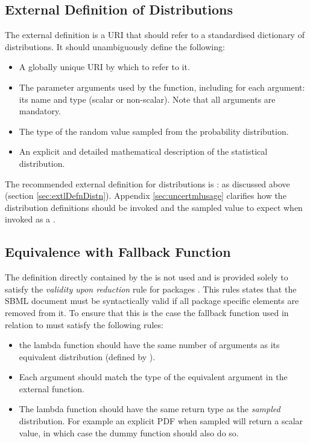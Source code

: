 \documentclass[draftspec]{sbmlpkgspec}
\begin{document}
\subsection{External Definition of Distributions}
\label{sec:externaldistdef}

The external definition is a URI that should refer to a standardised
dictionary of distributions. It should unambiguously define the
following:

\begin{itemize}
\item A globally unique URI by which to refer to it.
\item The parameter arguments used by the function, including for each
 argument: its name and type (scalar or non-scalar). Note that all
 arguments are mandatory.
\item The type of the random value sampled from the probability distribution.
\item An explicit and detailed mathematical description of the statistical distribution.
\end{itemize}

The recommended external definition for distributions is \uncertml: as
discussed above (section \ref{sec:extlDefnDistn}). Appendix
\ref{sec:uncertmlusage} clarifies how the distribution definitions
should be invoked and the sampled value to expect when invoked as a
.

\subsection{Equivalence with Fallback Function}
\label{sec:fallbackfunc}

The \mathml definition directly contained by the
 is not used and is provided solely to
satisfy the \emph{validity upon reduction} rule for packages
\cite{sbmll3v1packrule}. This rules states that the SBML document must
be syntactically valid if all package specific elements are removed
from it. To ensure that this is the case the fallback function used in
relation to \distribshort must satisfy the following rules:

\begin{itemize}
\item the lambda function should have the same number of arguments as
  its equivalent distribution (defined by \distribshort).
\item Each argument should match the type of the equivalent argument
  in the external function.
\item The lambda function should have the same return type as the
  \emph{sampled} distribution. For example an explicit PDF when
  sampled will return a scalar value, in which case the dummy function
  should also do so.
\end{itemize}
\end{document}
